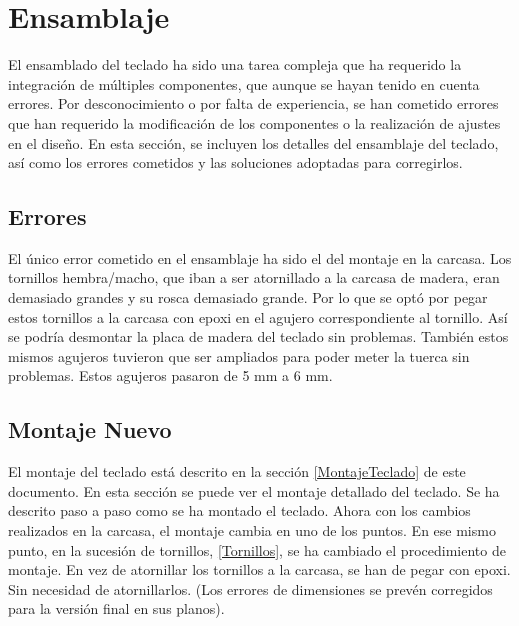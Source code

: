 \section{Ensamblaje}\label{ApendiceEnsamblaje}

El ensamblado del teclado ha sido una tarea compleja que ha requerido la integración de múltiples componentes, que aunque se hayan tenido en cuenta errores. Por desconocimiento o por falta de experiencia, se han cometido errores que han requerido la modificación de los componentes o la realización de ajustes en el diseño. En esta sección, se incluyen los detalles del ensamblaje del teclado, así como los errores cometidos y las soluciones adoptadas para corregirlos.

\subsection{Errores}\label{ApendiceEnsamblajeErrores}

El único error cometido en el ensamblaje ha sido el del montaje en la carcasa. Los tornillos hembra/macho, que iban a ser atornillado a la carcasa de madera, eran demasiado grandes y su rosca demasiado grande. Por lo que se optó por pegar estos tornillos a la carcasa con epoxi en el agujero correspondiente al tornillo. Así se podría desmontar la placa de madera del teclado sin problemas. También estos mismos agujeros tuvieron que ser ampliados para poder meter la tuerca sin problemas. Estos agujeros pasaron de 5 mm a 6 mm.

\subsection{Montaje Nuevo} \label{ApendiceEnsamblajeMontaje}

El montaje del teclado está descrito en la sección \ref{MontajeTeclado} de este documento. En esta sección se puede ver el montaje detallado del teclado. Se ha descrito paso a paso como se ha montado el teclado. Ahora con los cambios realizados en la carcasa, el montaje cambia en uno de los puntos. En ese mismo punto, en la sucesión de tornillos, \ref{Tornillos}, se ha cambiado el procedimiento de montaje. En vez de atornillar los tornillos a la carcasa, se han de pegar con epoxi. Sin necesidad de atornillarlos. (Los errores de dimensiones se prevén corregidos para la versión final en sus planos).